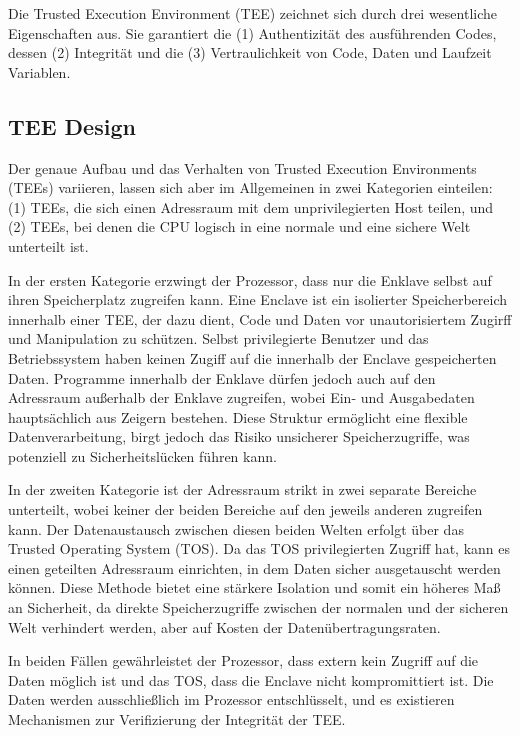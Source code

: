 Die Trusted Execution Environment (TEE) zeichnet sich durch drei wesentliche Eigenschaften aus. Sie garantiert die (1) Authentizität des ausführenden Codes, dessen (2) Integrität und die (3) Vertraulichkeit von Code, Daten und Laufzeit Variablen.

\subsection{TEE Design}

Der genaue Aufbau und das Verhalten von Trusted Execution Environments (TEEs) variieren, lassen sich aber im Allgemeinen in zwei Kategorien einteilen: (1) TEEs, die sich einen Adressraum mit dem unprivilegierten Host teilen, und (2) TEEs, bei denen die CPU logisch in eine normale und eine sichere Welt unterteilt ist.

In der ersten Kategorie erzwingt der Prozessor, dass nur die Enklave selbst auf ihren Speicherplatz zugreifen kann. Eine Enclave ist ein isolierter Speicherbereich innerhalb einer TEE, der dazu dient, Code und Daten vor unautorisiertem Zugirff und Manipulation zu schützen. Selbst privilegierte Benutzer und das Betriebssystem haben keinen Zugiff auf die innerhalb der Enclave gespeicherten Daten. Programme innerhalb der Enklave dürfen jedoch auch auf den Adressraum außerhalb der Enklave zugreifen, wobei Ein- und Ausgabedaten hauptsächlich aus Zeigern bestehen. Diese Struktur ermöglicht eine flexible Datenverarbeitung, birgt jedoch das Risiko unsicherer Speicherzugriffe, was potenziell zu Sicherheitslücken führen kann.

In der zweiten Kategorie ist der Adressraum strikt in zwei separate Bereiche unterteilt, wobei keiner der beiden Bereiche auf den jeweils anderen zugreifen kann. Der Datenaustausch zwischen diesen beiden Welten erfolgt über das Trusted Operating System (TOS). Da das TOS privilegierten Zugriff hat, kann es einen geteilten Adressraum einrichten, in dem Daten sicher ausgetauscht werden können. Diese Methode bietet eine stärkere Isolation und somit ein höheres Maß an Sicherheit, da direkte Speicherzugriffe zwischen der normalen und der sicheren Welt verhindert werden, aber auf Kosten der Datenübertragungsraten.

In beiden Fällen gewährleistet der Prozessor, dass extern kein Zugriff auf die Daten möglich ist und das TOS, dass die Enclave nicht kompromittiert ist. Die Daten werden ausschließlich im Prozessor entschlüsselt, und es existieren Mechanismen zur Verifizierung der Integrität der TEE.

